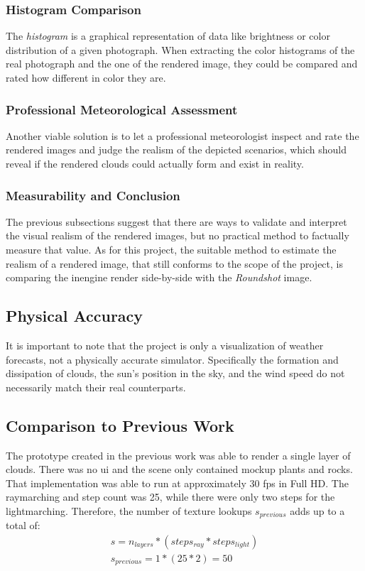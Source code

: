 \subsubsection{Histogram Comparison}
The \textit{\gls{histogram}} is a graphical representation of data like brightness or color distribution of a given photograph.
When extracting the color \gls{histogram}s of the real photograph and the one of the rendered image, they could be compared and rated how different in color they are.

\subsubsection{Professional Meteorological Assessment}
Another viable solution is to let a professional meteorologist inspect and rate the rendered images and judge the realism of the depicted scenarios, which should reveal if the rendered clouds could actually form and exist in reality.

\subsubsection{Measurability and Conclusion}
The previous subsections suggest that there are ways to validate and interpret the visual realism of the rendered images, but no practical method to factually measure that value.
As for this project, the suitable method to estimate the realism of a rendered image, that still conforms to the scope of the project, is comparing the \gls{inengine} render side-by-side with the \emph{Roundshot} image.

\subsection{Physical Accuracy}
It is important to note that the project is only a visualization of weather forecasts, not a physically accurate simulator.
Specifically the formation and dissipation of clouds, the sun's position in the sky, and the wind speed do not necessarily match their real counterparts.

\clearpage

\subsection{Comparison to Previous Work}
\label{section:techimpl:comparison}
The prototype created in the previous work was able to render a single layer of clouds. There was no \gls{ui} and the scene only contained mockup plants and rocks.
That implementation was able to run at approximately 30 \gls{fps} in Full HD. The \gls{raymarching} and step count was 25, while there were only two steps for the \gls{lightmarching}.
Therefore, the number of texture lookups $s_{previous}$ adds up to a total of:
$$
\begin{array}{l}
    s = n_{layers} * (steps_{ray} * steps_{light}) \\
    s_{previous} = 1 * (25 * 2) = 50
\end{array}
$$

